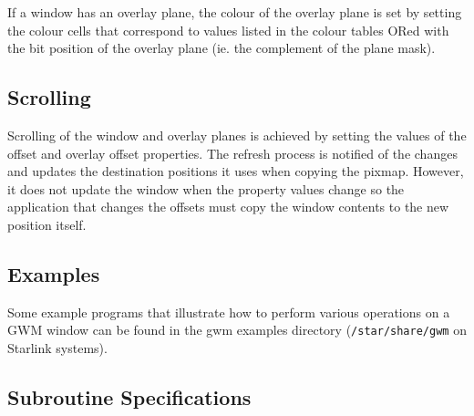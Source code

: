 If a window has an overlay plane, the colour of the overlay plane is set
by setting the colour cells that correspond to values listed in the
colour tables ORed with the bit position of the overlay plane (ie. the
complement of the plane mask).

\subsection{Scrolling}
Scrolling of the window and overlay planes is achieved by setting the
values of the offset and overlay offset properties. The refresh process
is notified of the changes and updates the destination positions it uses
when copying the pixmap. However, it does not update the window when the
property values change so the application that changes the offsets must
copy the window contents to the new position itself.

\subsection{Examples}

Some example programs that illustrate how to perform various operations on a
GWM window can be found in the gwm examples directory ({\tt /star/share/gwm}
on Starlink systems).

\newpage
\subsection{Subroutine Specifications}

